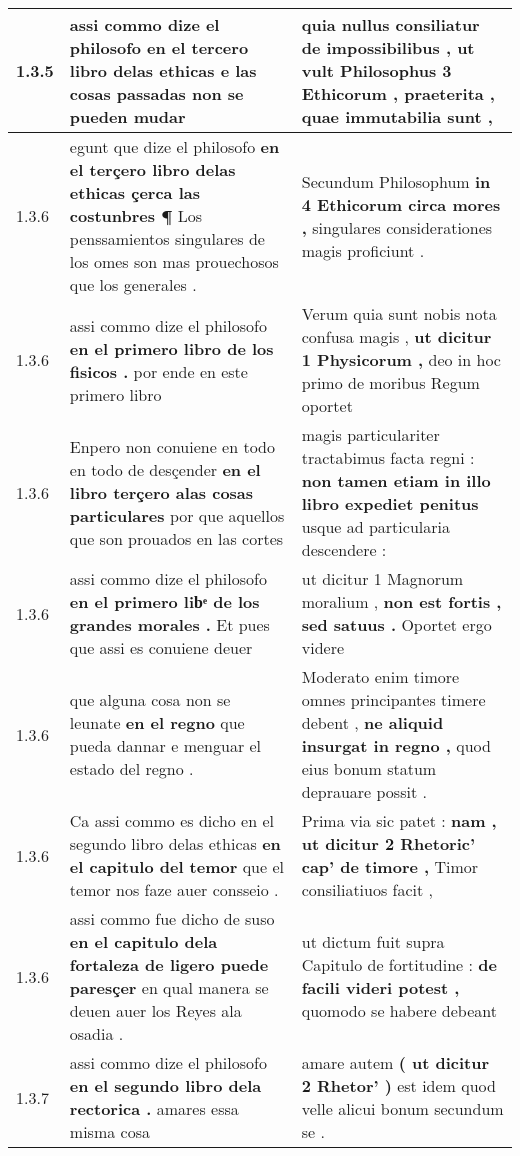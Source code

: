 \begin{tabular}{|p{1cm}|p{6.5cm}|p{6.5cm}|}
1.3.5 & assi commo dize el philosofo \textbf{ en el tercero libro delas ethicas } e las cosas passadas non se pueden mudar & quia nullus consiliatur de impossibilibus , \textbf{ ut vult Philosophus 3 Ethicorum , praeterita , } quae immutabilia sunt , \\\hline
1.3.6 & egunt que dize el philosofo \textbf{ en el terçero libro delas ethicas çerca las costunbres ¶ } Los penssamientos singulares de los omes son mas prouechosos que los generales . & Secundum Philosophum \textbf{ in 4 Ethicorum circa mores , } singulares considerationes magis proficiunt . \\\hline
1.3.6 & assi commo dize el philosofo \textbf{ en el primero libro de los fisicos . } por ende en este primero libro & Verum quia sunt nobis nota confusa magis , \textbf{ ut dicitur 1 Physicorum , } deo in hoc primo de moribus Regum oportet \\\hline
1.3.6 & Enpero non conuiene en todo en todo de desçender \textbf{ en el libro terçero alas cosas particulares } por que aquellos que son prouados en las cortes & magis particulariter tractabimus facta regni : \textbf{ non tamen etiam in illo libro expediet penitus } usque ad particularia descendere : \\\hline
1.3.6 & assi commo dize el philosofo \textbf{ en el primero libͤ de los grandes morales . } Et pues que assi es conuiene deuer & ut dicitur 1 Magnorum moralium , \textbf{ non est fortis , sed satuus . } Oportet ergo videre \\\hline
1.3.6 & que alguna cosa non se leunate \textbf{ en el regno } que pueda dannar e menguar el estado del regno . & Moderato enim timore omnes principantes timere debent , \textbf{ ne aliquid insurgat in regno , } quod eius bonum statum deprauare possit . \\\hline
1.3.6 & Ca assi commo es dicho en el segundo libro delas ethicas \textbf{ en el capitulo del temor } que el temor nos faze auer consseio . & Prima via sic patet : \textbf{ nam , ut dicitur 2 Rhetoric’ cap’ de timore , } Timor consiliatiuos facit , \\\hline
1.3.6 & assi commo fue dicho de suso \textbf{ en el capitulo dela fortaleza de ligero puede paresçer } en qual manera se deuen auer los Reyes ala osadia . & ut dictum fuit supra Capitulo de fortitudine : \textbf{ de facili videri potest , } quomodo se habere debeant \\\hline
1.3.7 & assi commo dize el philosofo \textbf{ en el segundo libro dela rectorica . } amares essa misma cosa & amare autem \textbf{ ( ut dicitur 2 Rhetor’ ) } est idem quod velle alicui bonum secundum se . \\\hline

\end{tabular}
